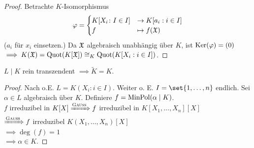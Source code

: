 \begin{proof}
	Betrachte $K$-Isomorphismus
	\begin{align*}
		\varphi = \begin{cases}
			K[X_i \colon I \in I] &\to K[a_i : i \in I]\\
			f & \mapsto f(\mathfrak{X})
		\end{cases} 
	\end{align*}
	($a_i$ für $x_i$ einsetzen.) Da $\mathfrak{X}$ algebraisch unabhängig über $K$, ist $\operatorname{Ker}(\varphi) = (0)$\\
	$\implies K(\mathfrak{X}) = \operatorname{Quot}(K[\mathfrak{X}]) \cong_K \operatorname{Quot}(K[X_i : i \in I])$.
\end{proof}
\begin{proposition}
	$L\mid K$ rein transzendent $\implies \tilde{K} = K$.
\end{proposition}
\begin{proof}
	Nach  o.E. $L = K(X_i : i \in I)$. Weiter o. E. $I = \set{1, \dots,n}$ endlich. Sei $\alpha \in L$ algebraisch über $K$. Definiere $f = \operatorname{MinPol}(\alpha \mid K)$.\\
	$f$ irreduzibel in $K[X] \xRightarrow{\text{\textsc{Gauss}}} f$ irreduzibel in $K[X_1, \dots, X_n][X]$\\
	$\xRightarrow{\text{\textsc{Gauss}}} f$ irreduzibel $K(X_1, \dots, X_n)[X]$\\
	$\implies \deg(f) = 1$\\
	$\implies \alpha \in K$.
\end{proof}